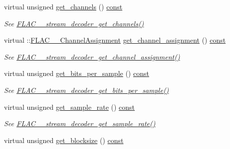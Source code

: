 \begin{DoxyCompactItemize}
virtual unsigned \hyperlink{class_f_l_a_c_1_1_decoder_1_1_stream_a60b5e0d25d6220b757a940a99880cc1b}{get\+\_\+channels} () \hyperlink{getopt1_8c_a2c212835823e3c54a8ab6d95c652660e}{const} 
\begin{DoxyCompactList}\small\item\em See \hyperlink{group__flac__stream__decoder_ga42b7d224faeee633e6359ac1f921f39a}{F\+L\+A\+C\+\_\+\+\_\+stream\+\_\+decoder\+\_\+get\+\_\+channels()} \end{DoxyCompactList}\item 
virtual \+::\hyperlink{group__flac__format_ga79855f8525672e37f299bbe02952ef9c}{F\+L\+A\+C\+\_\+\+\_\+\+Channel\+Assignment} \hyperlink{class_f_l_a_c_1_1_decoder_1_1_stream_a2e138dee55435050dedcc3ba08874b96}{get\+\_\+channel\+\_\+assignment} () \hyperlink{getopt1_8c_a2c212835823e3c54a8ab6d95c652660e}{const} 
\begin{DoxyCompactList}\small\item\em See \hyperlink{group__flac__stream__decoder_gad7906d840eef5c15ef5c8fe4571d1172}{F\+L\+A\+C\+\_\+\+\_\+stream\+\_\+decoder\+\_\+get\+\_\+channel\+\_\+assignment()} \end{DoxyCompactList}\item 
virtual unsigned \hyperlink{class_f_l_a_c_1_1_decoder_1_1_stream_a29bf73e10dad707875564772245b7dd6}{get\+\_\+bits\+\_\+per\+\_\+sample} () \hyperlink{getopt1_8c_a2c212835823e3c54a8ab6d95c652660e}{const} 
\begin{DoxyCompactList}\small\item\em See \hyperlink{group__flac__stream__decoder_ga2e4bae93f2ebf49babd88bb5fe54bd24}{F\+L\+A\+C\+\_\+\+\_\+stream\+\_\+decoder\+\_\+get\+\_\+bits\+\_\+per\+\_\+sample()} \end{DoxyCompactList}\item 
virtual unsigned \hyperlink{class_f_l_a_c_1_1_decoder_1_1_stream_a9f70266044b3edf1515ab52dc1992631}{get\+\_\+sample\+\_\+rate} () \hyperlink{getopt1_8c_a2c212835823e3c54a8ab6d95c652660e}{const} 
\begin{DoxyCompactList}\small\item\em See \hyperlink{group__flac__stream__decoder_ga83f1359028e0646c1e50c1aef0d9fd6d}{F\+L\+A\+C\+\_\+\+\_\+stream\+\_\+decoder\+\_\+get\+\_\+sample\+\_\+rate()} \end{DoxyCompactList}\item 
virtual unsigned \hyperlink{class_f_l_a_c_1_1_decoder_1_1_stream_a8786f9a751f3f3813d5451ca9ebfd495}{get\+\_\+blocksize} () \hyperlink{getopt1_8c_a2c212835823e3c54a8ab6d95c652660e}{const} 

\end{DoxyCompactItemize}
